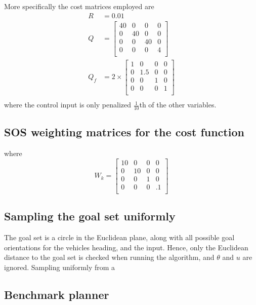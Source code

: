 More specifically the cost matrices employed are
\begin{align*}
  R &= 0.01 \\
  Q &= \begin{bmatrix}
    40 & 0 & 0 & 0 \\
    0 & 40 & 0 & 0 \\
    0 & 0 & 40 & 0 \\
    0 & 0 & 0 & 4 \\
  \end{bmatrix}
  \\
  Q_{f} &=
          2\times
  \begin{bmatrix}
    1 & 0 & 0 & 0 \\
    0 & 1.5 & 0 & 0 \\
    0 & 0 & 1 & 0 \\
    0 & 0 & 0 & 1 \\
  \end{bmatrix}
\\
\end{align*}
where the control input is only penalized \(\frac{1}{10}\)th of the other
variables.

\subsection{SOS weighting matrices for the cost function}

where
\begin{equation}
  W_{k} =
  \begin{bmatrix}
    10 & 0 & 0 & 0 \\
    0 & 10 & 0 & 0 \\
    0 & 0 & 1 & 0 \\
    0 & 0 & 0 & .1 \\
  \end{bmatrix}
\end{equation}


\subsection{Sampling the goal set uniformly}

The goal set is a circle in the Euclidean plane, along with all possible goal
orientations for the vehicles heading, and the input. Hence, only the Euclidean
distance to the goal set is checked when running the algorithm, and \(\theta\)
and \(u\) are ignored. Sampling uniformly from a 

\subsection{Benchmark planner}

